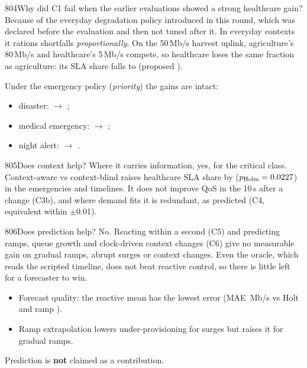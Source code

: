 \begin{qa}{804}{Why did C1 fail when the earlier evaluations showed a strong healthcare gain?}
Because of the everyday degradation policy introduced in this round, which was declared before the evaluation and
then not tuned after it. In everyday contexts it rations shortfalls \emph{proportionally}. On the 50\,Mb/s harvest
uplink, agriculture's 80\,Mb/s and healthcare's 5\,Mb/s compete, so healthcare loses the same fraction as
agriculture: its SLA share falls to \NFCHarvestFiveZeromAdHc{} (proposed \NFCHarvestFiveZeromPropHc).

Under the emergency policy (\emph{priority}) the gains are intact:
\begin{itemize}
\item disaster: \NFCDisasterPropHc{} $\rightarrow$ \NFCDisasterAdHc;
\item medical emergency: \NFCMedicalEmergencyPropHc{} $\rightarrow$ \NFCMedicalEmergencyAdHc;
\item night alert: \NFCMedicalNightPropHc{} $\rightarrow$ \NFCMedicalNightAdHc.
\end{itemize}
\end{qa}

\begin{qa}{805}{Does context help?}
Where it carries information, yes, for the critical class. Context-aware vs context-blind raises healthcare SLA share
by \NFCThreeaDiff{} ($p_{\text{Holm}}=0.0227$) in the emergencies and timelines. It does not improve QoS in
the 10\,s after a change (C3b), and where demand fits it is redundant, as predicted (C4, equivalent within $\pm$0.01).
\end{qa}

\begin{qa}{806}{Does prediction help?}
No. Reacting within a second (C5) and predicting ramps, queue growth and clock-driven context changes (C6) give no
measurable gain on gradual ramps, abrupt surges or context changes. Even the oracle, which reads the scripted timeline,
does not beat reactive control, so there is little left for a forecaster to win.
\begin{itemize}
\item Forecast quality: the reactive mean has the lowest error (MAE \NFqReactiveMae\,Mb/s vs Holt \NFqHoltMae{} and
ramp \NFqRampMae).
\item Ramp extrapolation lowers under-provisioning for surges but raises it for gradual ramps.
\end{itemize}
Prediction is \textbf{not} claimed as a contribution.
\end{qa}


